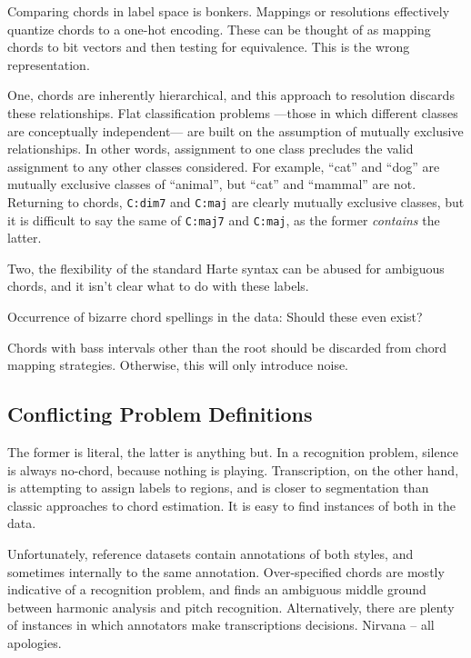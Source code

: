 \documentclass{article}
\begin{document}
Comparing chords in label space is bonkers.
Mappings or resolutions effectively quantize chords to a one-hot encoding.
These can be thought of as mapping chords to bit vectors and then testing for equivalence.
This is the wrong representation.

One, chords are inherently hierarchical, and this approach to resolution discards these relationships.
Flat classification problems ---those in which different classes are conceptually independent--- are built on the assumption of mutually exclusive relationships.
In other words, assignment to one class precludes the valid assignment to any other classes considered.
For example, ``cat'' and ``dog'' are mutually exclusive classes of ``animal'', but ``cat'' and ``mammal'' are not.
Returning to chords, \texttt{C:dim7} and \texttt{C:maj} are clearly mutually exclusive classes, but it is difficult to say the same of \texttt{C:maj7} and \texttt{C:maj}, as the former \emph{contains} the latter.

Two, the flexibility of the standard Harte syntax can be abused for ambiguous chords, and it isn't clear what to do with these labels.

Occurrence of bizarre chord spellings in the data:
Should these even exist?



Chords with bass intervals other than the root should be discarded from chord mapping strategies.
Otherwise, this will only introduce noise.


\subsection{Conflicting Problem Definitions}

The former is literal, the latter is anything but.
In a recognition problem, silence is always no-chord, because nothing is playing.
Transcription, on the other hand, is attempting to assign labels to regions, and is closer to segmentation than classic approaches to chord estimation.
It is easy to find instances of both in the data.

Unfortunately, reference datasets contain annotations of both styles, and sometimes internally to the same annotation.
Over-specified chords are mostly indicative of a recognition problem, and finds an ambiguous middle ground between harmonic analysis and pitch recognition.
Alternatively, there are plenty of instances in which annotators make transcriptions decisions.
Nirvana -- all apologies.
\end{document}
